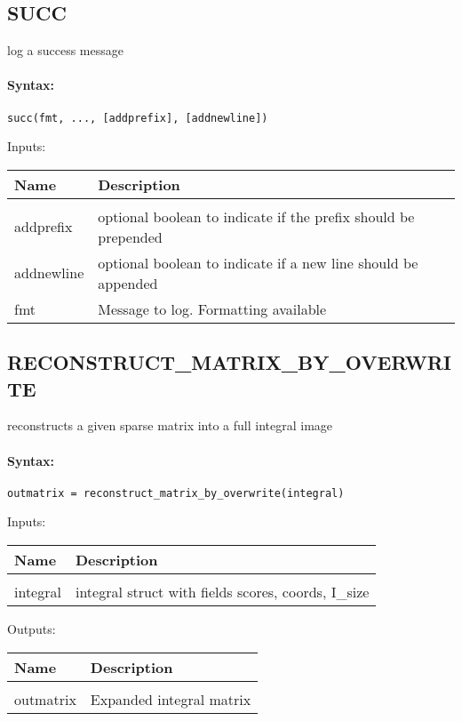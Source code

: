 \subsection{SUCC}

log a success message

\paragraph{Syntax:} \verb|succ(fmt, ..., [addprefix], [addnewline])|

Inputs:

\begin{tabular}{|l|p{5cm}|}
\hline
\textbf{Name} & \textbf{Description} \\
\hline \hline \\
addprefix & optional boolean to indicate if the prefix should be prepended  \\ \hline
addnewline & optional boolean to indicate if a new line should be appended  \\ \hline
fmt & Message to log. Formatting available  \\ \hline
\end{tabular}

\subsection{RECONSTRUCT\_MATRIX\_BY\_OVERWRITE}

reconstructs a given sparse matrix into a full integral image

\paragraph{Syntax:} \verb|outmatrix = reconstruct_matrix_by_overwrite(integral)|

Inputs:

\begin{tabular}{|l|p{5cm}|}
\hline
\textbf{Name} & \textbf{Description} \\
\hline \hline \\
integral & integral struct with fields scores, coords, I\_size  \\ \hline
\end{tabular}
Outputs:

\begin{tabular}{|l|p{5cm}|}
\hline
\textbf{Name} & \textbf{Description} \\
\hline \hline \\
outmatrix & Expanded integral matrix  \\ \hline
\end{tabular}

